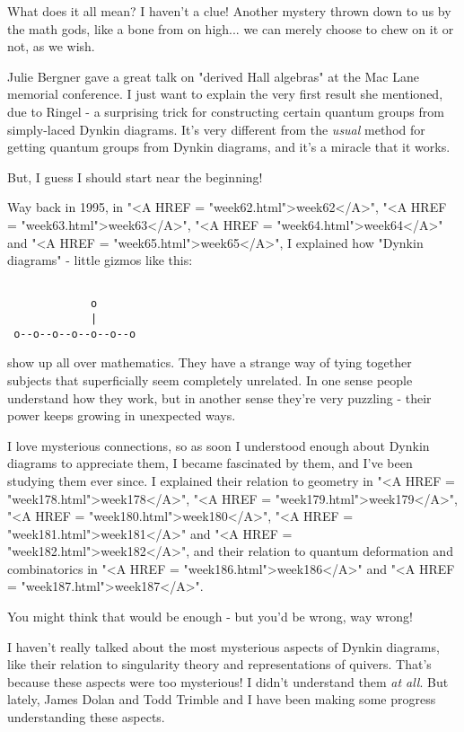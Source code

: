 What does it all mean?  I haven't a clue!   Another mystery thrown
down to us by the math gods, like a bone from on high... we can merely
choose to chew on it or not, as we wish.

Julie Bergner gave a great talk on "derived Hall algebras" at the 
Mac Lane memorial conference.  I just want to explain the very
first result she mentioned, due to Ringel - a surprising trick for 
constructing certain quantum groups from simply-laced Dynkin diagrams. 
It's very different from the \emph{usual} method for getting quantum groups 
from Dynkin diagrams, and it's a miracle that it works.  

But, I guess I should start near the beginning!

Way back in 1995, in "<A HREF = "week62.html">week62</A>", "<A HREF = "week63.html">week63</A>", "<A HREF = "week64.html">week64</A>" and "<A HREF = "week65.html">week65</A>", 
I explained how "Dynkin diagrams" - little gizmos like this:


\begin{verbatim}

             o
             |
 o--o--o--o--o--o--o
\end{verbatim}
    
show up all over mathematics.  They have a strange way of tying 
together subjects that superficially seem completely unrelated.
In one sense people understand how they work, but in another sense
they're very puzzling - their power keeps growing in unexpected ways.  

I love mysterious connections, so as soon I understood enough about
Dynkin diagrams to appreciate them, I became fascinated by them, 
and I've been studying them ever since.  I explained their relation
to geometry in "<A HREF = "week178.html">week178</A>", "<A HREF = "week179.html">week179</A>", "<A HREF = "week180.html">week180</A>", "<A HREF = "week181.html">week181</A>" and "<A HREF = "week182.html">week182</A>",
and their relation to quantum deformation and combinatorics in 
"<A HREF = "week186.html">week186</A>" and "<A HREF = "week187.html">week187</A>".  

You might think that would be enough - but you'd be wrong, way wrong!  

I haven't really talked about the most mysterious aspects of Dynkin 
diagrams, like their relation to singularity theory and representations
of quivers.  That's because these aspects were too mysterious!  
I didn't understand them \emph{at all}.  But lately, James Dolan and Todd 
Trimble and I have been making some progress understanding these aspects.  

